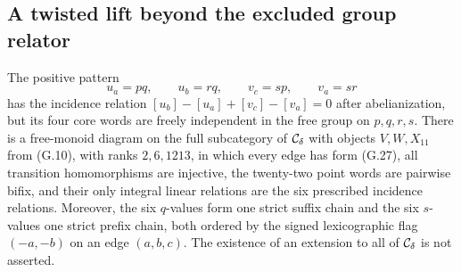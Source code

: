 \subsection{A twisted lift beyond the excluded group relator}

\begin{example}
\label{G:twisted-finite}
The positive pattern
\[
 u_a=pq,\qquad u_b=rq,\qquad v_c=sp,\qquad v_a=sr
 \tag{G.27}
\]
has the incidence relation
$[u_b]-[u_a]+[v_c]-[v_a]=0$ after abelianization,
but its four core words are freely independent in the free group
on $p,q,r,s$. There is a free-monoid diagram on the full
subcategory of $\mathcal C_\delta$ with objects $V,W,X_{11}$ from (G.10),
with ranks $2,6,1213$, in which every edge has form (G.27), all
transition homomorphisms are injective, the twenty-two point
words are pairwise bifix, and their only integral linear
relations are the six prescribed incidence relations.
Moreover, the six $q$-values form one strict suffix chain and
the six $s$-values one strict prefix chain, both ordered by the
signed lexicographic flag $(-a,-b)$ on an edge $(a,b,c)$.
The existence of an extension to all of $\mathcal C_\delta$ is not asserted.
\end{example}

